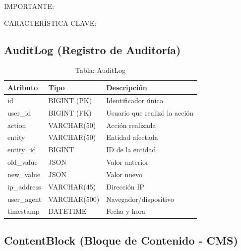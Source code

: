 \documentclass[12pt,a4paper,oneside]{book}
\begin{document}
\begin{alert}{IMPORTANTE:}
\begin{info}{CARACTERÍSTICA CLAVE:}
\subsection{AuditLog (Registro de Auditoría)}
\label{sec:auditlog}

\begin{table}[ht]
    \centering
    \caption{Tabla: AuditLog}
    \begin{tabular}{@{}lll@{}}
        \toprule
        \textbf{Atributo} & \textbf{Tipo} & \textbf{Descripción} \\
        \midrule
        id & BIGINT (PK) & Identificador único \\
        user\_id & BIGINT (FK) & Usuario que realizó la acción \\
        action & VARCHAR(50) & Acción realizada \\
        entity & VARCHAR(50) & Entidad afectada \\
        entity\_id & BIGINT & ID de la entidad \\
        old\_value & JSON & Valor anterior \\
        new\_value & JSON & Valor nuevo \\
        ip\_address & VARCHAR(45) & Dirección IP \\
        user\_agent & VARCHAR(500) & Navegador/dispositivo \\
        timestamp & DATETIME & Fecha y hora \\
        \bottomrule
    \end{tabular}
\end{table}

\subsection{ContentBlock (Bloque de Contenido - CMS)}
\label{sec:contentblock}


\end{info}
\end{alert}
\end{document}
